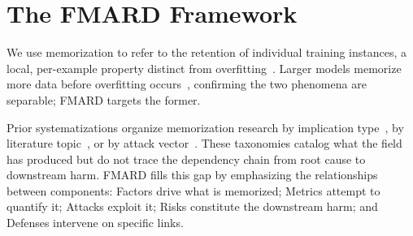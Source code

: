 \documentclass[11pt]{article}
\begin{document}
\section{The FMARD Framework}
\label{sec:framework}

We use memorization to refer to the retention of individual training instances,
a local, per-example property distinct from
overfitting~\citep{vandenburg2021memorization,
tirumala2022memorizationoverfittinganalyzingtraining}.
Larger models memorize more data before overfitting
occurs~\citep{tirumala2022memorizationoverfittinganalyzingtraining},
confirming the two phenomena are separable; FMARD targets the former.

Prior systematizations organize memorization research by implication
type~\citep{hartmann2023sok}, by literature
topic~\citep{satvaty2024undesirable}, or by attack
vector~\citep{meeus2025sok}.
These taxonomies catalog what the field has produced but do not trace the
dependency chain from root cause to downstream harm.
FMARD fills this gap by emphasizing the relationships between components:
Factors drive what is memorized; Metrics attempt to quantify it; Attacks
exploit it; Risks constitute the downstream harm; and Defenses intervene on
specific links.
\end{document}
